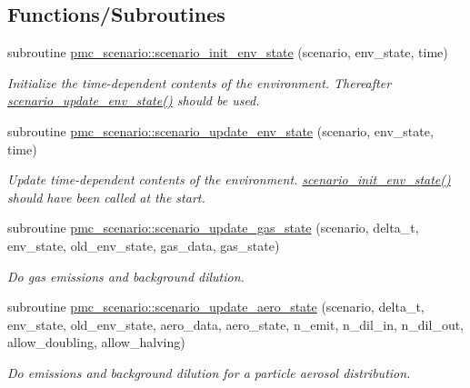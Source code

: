 \subsection*{Functions/\+Subroutines}
\begin{DoxyCompactItemize}
\item 
subroutine \mbox{\hyperlink{namespacepmc__scenario_a9ba2febb35bfe14fe1ce49994de7fdb9}{pmc\+\_\+scenario\+::scenario\+\_\+init\+\_\+env\+\_\+state}} (scenario, env\+\_\+state, time)
\begin{DoxyCompactList}\small\item\em Initialize the time-\/dependent contents of the environment. Thereafter \mbox{\hyperlink{namespacepmc__scenario_a88ccdf6c90762496ecbb93e45cc92bb7}{scenario\+\_\+update\+\_\+env\+\_\+state()}} should be used. \end{DoxyCompactList}\item 
subroutine \mbox{\hyperlink{namespacepmc__scenario_a88ccdf6c90762496ecbb93e45cc92bb7}{pmc\+\_\+scenario\+::scenario\+\_\+update\+\_\+env\+\_\+state}} (scenario, env\+\_\+state, time)
\begin{DoxyCompactList}\small\item\em Update time-\/dependent contents of the environment. \mbox{\hyperlink{namespacepmc__scenario_a9ba2febb35bfe14fe1ce49994de7fdb9}{scenario\+\_\+init\+\_\+env\+\_\+state()}} should have been called at the start. \end{DoxyCompactList}\item 
subroutine \mbox{\hyperlink{namespacepmc__scenario_a8da20291ae6441134e5f1788a906e96b}{pmc\+\_\+scenario\+::scenario\+\_\+update\+\_\+gas\+\_\+state}} (scenario, delta\+\_\+t, env\+\_\+state, old\+\_\+env\+\_\+state, gas\+\_\+data, gas\+\_\+state)
\begin{DoxyCompactList}\small\item\em Do gas emissions and background dilution. \end{DoxyCompactList}\item 
subroutine \mbox{\hyperlink{namespacepmc__scenario_a6d0621141b705a051b14761430d385ca}{pmc\+\_\+scenario\+::scenario\+\_\+update\+\_\+aero\+\_\+state}} (scenario, delta\+\_\+t, env\+\_\+state, old\+\_\+env\+\_\+state, aero\+\_\+data, aero\+\_\+state, n\+\_\+emit, n\+\_\+dil\+\_\+in, n\+\_\+dil\+\_\+out, allow\+\_\+doubling, allow\+\_\+halving)
\begin{DoxyCompactList}\small\item\em Do emissions and background dilution for a particle aerosol distribution. \end{DoxyCompactList}\item 

\end{DoxyCompactItemize}
